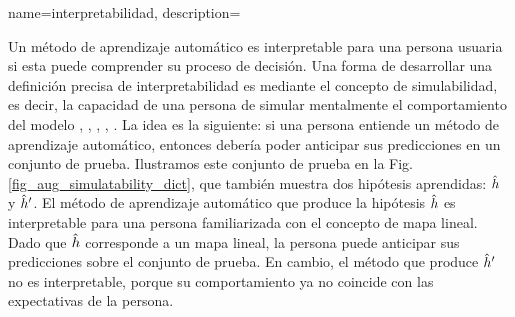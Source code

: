 {name={interpretabilidad},
description={Un método de aprendizaje automático es interpretable para una persona usuaria si esta puede comprender su proceso de decisión. 
Una forma de desarrollar una definición precisa de interpretabilidad es mediante el concepto de simulabilidad, es decir, la capacidad de una persona de simular mentalmente el comportamiento del modelo
\cite{Colin:2022aa}, \cite{Chen2018}, \cite{doshi2017towards}, \cite{hase-bansal-2020-evaluating}, \cite{Lipton2018}. 
La idea es la siguiente: si una persona entiende un método de aprendizaje automático, entonces debería poder anticipar sus predicciones en un conjunto de prueba. 
Ilustramos este conjunto de prueba en la Fig. \ref{fig_aug_simulatability_dict}, que también muestra dos hipótesis aprendidas: $\hat{h}$ y $\hat{h}'$. 
El método de aprendizaje automático que produce la hipótesis $\hat{h}$ es interpretable para una persona familiarizada con el concepto de mapa lineal. 
Dado que $\hat{h}$ corresponde a un mapa lineal, la persona puede anticipar sus predicciones sobre el conjunto de prueba. 
En cambio, el método que produce $\hat{h}'$ no es interpretable, porque su comportamiento ya no coincide con las expectativas de la persona.
\begin{figure}[H]
\begin{center} 
\end{center}
\end{figure}}}
